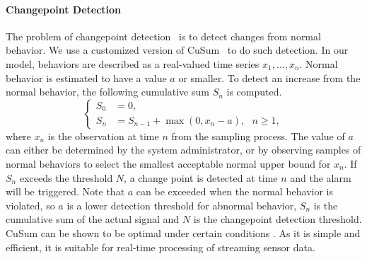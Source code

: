 \paragraph{Changepoint Detection}\label{subsec:changepoint}

\begin{table}[tb]
  \centering
  \noindent{}
  \caption{Overview of malware detection rules using changepoint detection. }\label{tbl:detect-malware}
\end{table}

The problem of changepoint detection~\cite{basseville1993detection} is to
detect changes from normal behavior.
We use a customized version of CuSum~\cite{page1954continuous} to do such
detection. In our model, behaviors are described as a real-valued
time series $x_1, \ldots, x_n$. Normal behavior is estimated to have a value
$a$ or smaller. To detect an
increase from the normal behavior,
the following cumulative sum $S_n$ is computed.
\begin{displaymath}
\left\{
\begin{aligned}
S_0 &= 0, \\
S_n &= S_{n-1} + \max(0, x_{n} - a), \ \ \ n \geq 1,
\end{aligned}
\right.
\end{displaymath}
\noindent where $x_n$ is the observation at time $n$ from the
sampling process. The value of $a$ can either be determined by the system
administrator, or by observing samples of normal behaviors to select
the smallest acceptable normal upper bound for $x_n$. If $S_n$
exceeds the threshold $N$, a change point is detected at time $n$
and the alarm will be triggered. Note that $a$ can be exceeded when
the normal behavior is violated, so $a$ is a lower detection threshold
for abnormal behavior, $S_n$ is the cumulative sum
of the actual signal and $N$ is the
changepoint detection threshold. CuSum can be shown to be optimal
under certain conditions \cite{basseville1993detection}. As it is simple
and efficient, it is suitable for real-time processing of streaming
sensor data.

